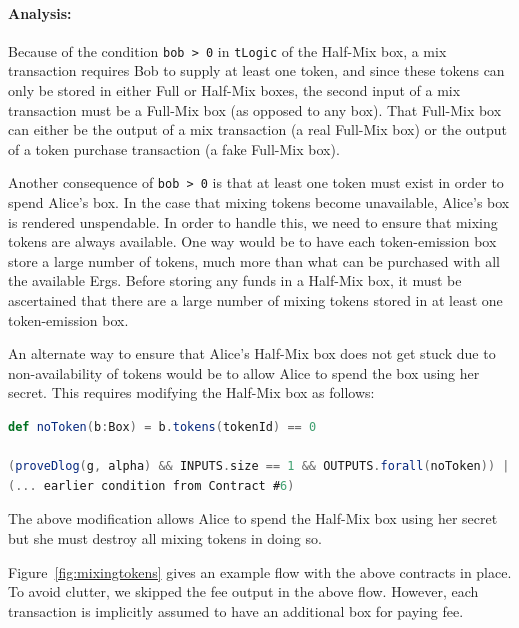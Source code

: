 \documentclass[runningheads]{llncs}
\begin{document}
\paragraph{Analysis:} 
Because of the condition \texttt{bob > 0} in \texttt{tLogic} of the Half-Mix box, a mix transaction requires Bob to supply at least one token, and since these tokens can only be stored in either Full or Half-Mix boxes, the second input of a mix transaction must be a Full-Mix box (as opposed to any box).
That Full-Mix box can either be the output of a mix transaction (a real Full-Mix box) or the output of a token purchase transaction (a fake Full-Mix box).

Another consequence of \texttt{bob > 0} is that at least one token must exist in order to spend Alice's box. In the case that mixing tokens become unavailable, Alice's box is rendered unspendable. In order to handle this, we need to ensure that mixing tokens are always available. One way would be to have each token-emission box store a large number of tokens, much more than what can be purchased with all the available Ergs. Before storing any funds in a Half-Mix box, it must be ascertained that there are a large number of mixing tokens stored in at least one token-emission box. 

An alternate way to ensure that Alice's Half-Mix box does not get stuck due to non-availability of tokens would be to allow Alice to spend the box using her secret. This requires modifying the Half-Mix box as follows:

\begin{lstlisting}[language=Scala,caption={Half script with withdraw capability},label=halfMixScriptWithWithdraw]
def noToken(b:Box) = b.tokens(tokenId) == 0

(proveDlog(g, alpha) && INPUTS.size == 1 && OUTPUTS.forall(noToken)) || 
(... earlier condition from Contract #6)
\end{lstlisting}

The above modification allows Alice to spend the Half-Mix box using her secret but she must destroy all mixing tokens in doing so. 

Figure~\ref{fig:mixingtokens} gives an example flow with the above contracts in place. To avoid clutter, we skipped the fee output in the above flow. However, each transaction is implicitly assumed to have an additional box for paying fee.
\end{document}
